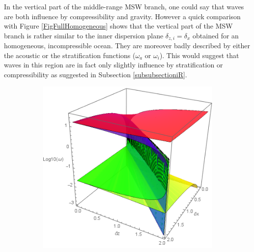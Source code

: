 \documentclass[a4paper,11pt]{article}
\begin{document}
In the vertical part of the middle-range MSW branch, one could say that waves are both influence by compressibility and gravity. However a quick comparison with Figure \ref{FigFullHomogeneous} shows that the vertical part of the MSW branch is rather similar to the inner dispersion plane $\delta_{z,i}=\delta_x$ obtained for an homogeneous, incompressible ocean. They are moreover badly described by either the acoustic or the stratification functions ($\omega_a$ or $\omega_i$). This would suggest that waves in this region are in fact only slightly influence by stratification or compressibility as suggested in Subsection \ref{subsubsectioniR}.\\

\begin{figure}[!h]
	\centering		
	\begin{subfigure}{0.45\linewidth}
		\includegraphics[width=1\linewidth]{FIGURES/Fig_omega.png}
		\caption{}
	\end{subfigure}
	~
	\centering		
	\begin{subfigure}{0.45\linewidth}

\end{subfigure}
\end{figure}
\end{document}
